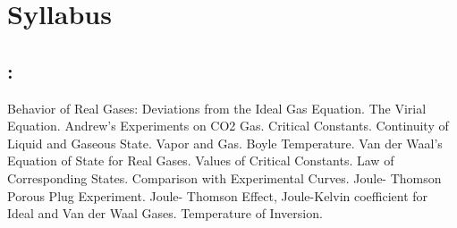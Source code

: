 \section*{Syllabus}

    \subsection*{\topicSubTitle: \topicTitle}
        Behavior of Real Gases: Deviations from the Ideal Gas Equation. The Virial Equation. Andrew's Experiments on CO2 Gas. Critical Constants. Continuity of Liquid and Gaseous State. Vapor and Gas. Boyle Temperature. Van der Waal’s Equation of State for Real Gases. Values of Critical Constants. Law of Corresponding States. Comparison with Experimental Curves. Joule- Thomson Porous Plug Experiment. Joule- Thomson Effect, Joule-Kelvin coefficient for Ideal and Van der Waal Gases. Temperature of Inversion.